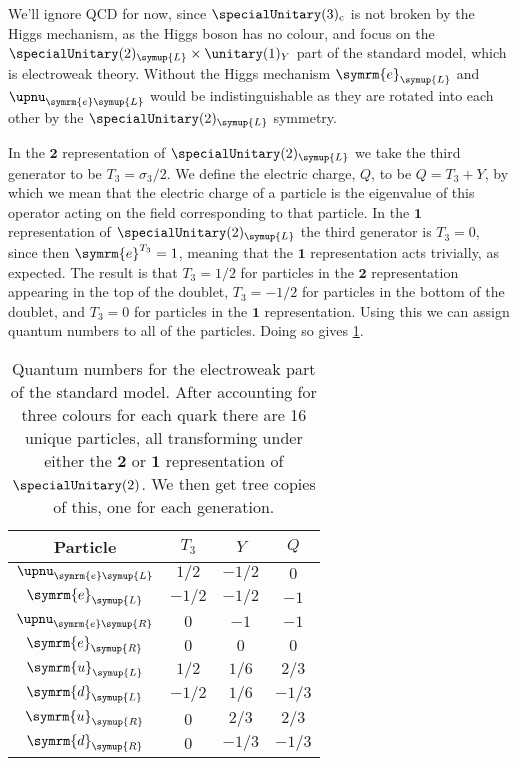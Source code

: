 \documentclass[fleqn]{NotesClass}
\newcommand{\Pparticle}[1]{\symrm{#1}}
\newcommand{\Penominus}{\ensuremath{\Pparticle{e}}}
\newcommand{\Pup}{\ensuremath{\Pparticle{u}}}
\newcommand{\Pdown}{\ensuremath{\Pparticle{d}}}
\newcommand{\e}{\symrm{e}}
\newcommand{\Left}{\symup{L}}
\newcommand{\Right}{\symup{R}}
\newcommand{\rep}[1]{\symbf{#1}}
\begin{document}
    We'll ignore QCD for now, since \(\specialUnitary(3)_{\mathrm{c}}\) is not broken by the Higgs mechanism, as the Higgs boson has no colour, and focus on the \(\specialUnitary(2)_{\Left} \times \unitary(1)_{Y}\) part of the standard model, which is electroweak theory.
    Without the Higgs mechanism \(\Penominus_{\Left}\) and \(\upnu_{\Penominus \Left}\) would be indistinguishable as they are rotated into each other by the \(\specialUnitary(2)_{\Left}\) symmetry.
    
    In the \(\rep{2}\) representation of \(\specialUnitary(2)_{\Left}\) we take the third generator to be \(T_3 = \sigma_3/2\).
    We define the electric charge, \(Q\), to be \(Q = T_3 + Y\), by which we mean that the electric charge of a particle is the eigenvalue of this operator acting on the field corresponding to that particle.
    In the \(\rep{1}\) representation of \(\specialUnitary(2)_{\Left}\) the third generator is \(T_3 = 0\), since then \(\e^{T_3} = 1\), meaning that the \(\rep{1}\) representation acts trivially, as expected.
    The result is that \(T_3 = 1/2\) for particles in the \(\rep{2}\) representation appearing in the top of the doublet, \(T_3 = -1/2\) for particles in the bottom of the doublet, and \(T_3 = 0\) for particles in the \(\rep{1}\) representation.
    Using this we can assign quantum numbers to all of the particles.
    Doing so gives \cref{tab:EW quantum numbers}.
    
    \begin{table}
        \caption[Quantum numbers for the electroweak part of the standard model.]{Quantum numbers for the electroweak part of the standard model. After accounting for three colours for each quark there are 16 unique particles, all transforming under either the \(\rep{2}\) or \(\rep{1}\) representation of \(\specialUnitary(2)\). We then get tree copies of this, one for each generation.}
        \label{tab:EW quantum numbers}
        \begin{tabular}{cccc}\toprule
            Particle & \(T_3\) & \(Y\) & \(Q\) \\ \midrule
            \(\upnu_{\Penominus \Left}\)  & \(1/2\)  & \(-1/2\) & \(0\)    \\
            \(\Penominus_{\Left}\)        & \(-1/2\) & \(-1/2\) & \(-1\)   \\
            \(\upnu_{\Penominus \Right}\) & \(0\)    & \(-1\)   & \(-1\)   \\
            \(\Penominus_{\Right}\)       & \(0\)    & \(0\)    & \(0\)    \\
            \(\Pup_{\Left}\)              & \(1/2\)  & \(1/6\)  & \(2/3\)  \\
            \(\Pdown_{\Left}\)            & \(-1/2\) & \(1/6\)  & \(-1/3\) \\
            \(\Pup_{\Right}\)             & \(0\)    & \(2/3\)  & \(2/3\)  \\
            \(\Pdown_{\Right}\)           & \(0\)    & \(-1/3\) & \(-1/3\) \\\bottomrule
        \end{tabular}
    \end{table}
    
\end{document}
